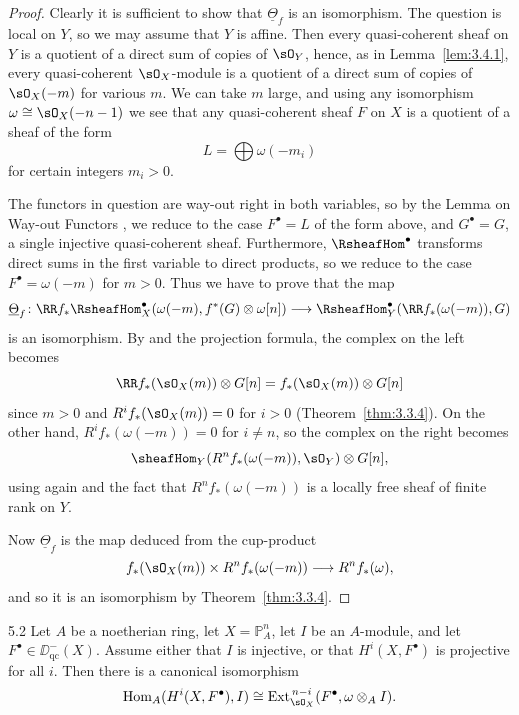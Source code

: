 \begin{proof}
Clearly it is sufficient to show that $\underline{\Theta}_f$ is an isomorphism. The question is local on $Y$, so we may assume that $Y$ is affine. Then every quasi-coherent sheaf on $Y$ is a quotient of a direct sum of copies of $\sO_Y$, hence, as in Lemma~\ref{lem:3.4.1}, every quasi-coherent $\sO_X$-module is a quotient of a direct sum of copies of $\sO_X(-m)$ for various $m$. We can take $m$ large, and using any isomorphism $\omega\cong\sO_X(-n-1)$ we see that any quasi-coherent sheaf $F$ on $X$ is a quotient of a sheaf of the form
\[
L = \bigoplus \omega(-m_i)
\]
for certain integers $m_i>0$.

The functors in question are way-out right in both variables, so by the Lemma on Way-out Functors , we reduce to the case $F^\bullet=L$ of the form above, and $G^\bullet=G$, a single injective quasi-coherent sheaf. Furthermore, $\RsheafHom^\bullet$ transforms direct sums in the first variable to direct products, so we reduce to the case $F^\bullet=\omega(-m)$ for $m>0$. Thus we have to prove that the map
\[
\underline{\Theta}_f \colon \RR f_* \RsheafHom_X^\bullet(\omega(-m), f^*(G)\otimes\omega[n]) \longrightarrow \RsheafHom_Y^\bullet(\RR f_*(\omega(-m)), G)
\]
is an isomorphism. By  and the projection formula, the complex on the left becomes
\[
\RR f_*(\sO_X(m))\otimes G[n] = f_*(\sO_X(m))\otimes G[n]
\]
since $m>0$ and $R^i f_*(\sO_X(m))=0$ for $i>0$ (Theorem~\ref{thm:3.3.4}). On the other hand, $R^i f_*(\omega(-m))=0$ for $i\neq n$, so the complex on the right becomes
\[
\sheafHom_Y(R^n f_*(\omega(-m)), \sO_Y)\otimes G[n],
\]
using again  and the fact that $R^n f_*(\omega(-m))$ is a locally free sheaf of finite rank on $Y$.

Now $\underline{\Theta}_f$ is the map deduced from the cup-product
\[
f_*(\sO_X(m)) \times R^n f_*(\omega(-m)) \longrightarrow R^n f_*(\omega),
\]
and so it is an isomorphism by Theorem~\ref{thm:3.3.4}.
\end{proof}

\begin{bookcorollary}{5.2}\label{cor:3.5.2}
Let $A$ be a noetherian ring, let $X=\mathbb{P}_A^n$, let $I$ be an $A$-module, and let $F^\bullet\in\DD_{\mathrm{qc}}^-(X)$. Assume either that $I$ is injective, or that $H^i(X,F^\bullet)$ is projective for all $i$. Then there is a canonical isomorphism
\[
\operatorname{Hom}_A(H^i(X,F^\bullet), I) \cong \operatorname{Ext}_{\sO_X}^{\,n-i}(F^\bullet, \omega\otimes_A I).
\]
\end{bookcorollary}

